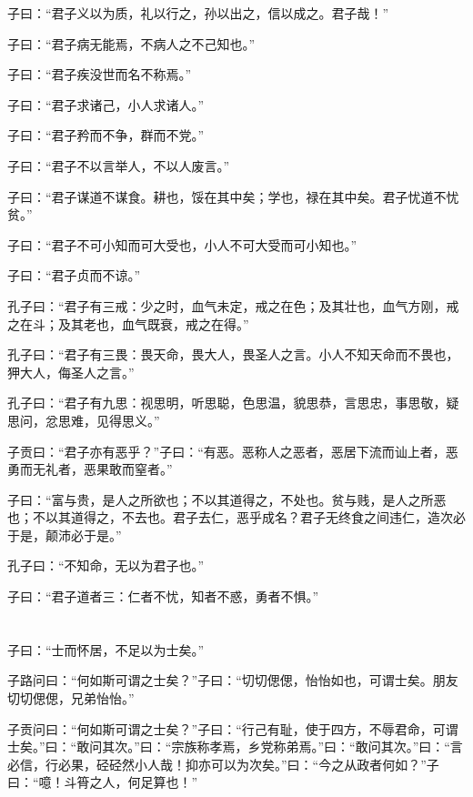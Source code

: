 \documentclass[a5paper]{ctexbook}
\begin{document}
    子曰：“君子义以为质，礼以行之，孙以出之，信以成之。君子哉！”

    子曰：“君子病无能焉，不病人之不己知也。”

    子曰：“君子疾没世而名不称焉。”

    子曰：“君子求诸己，小人求诸人。”

    子曰：“君子矜而不争，群而不党。”

    子曰：“君子不以言举人，不以人废言。”

    子曰：“君子谋道不谋食。耕也，馁在其中矣；学也，禄在其中矣。君子忧道不忧贫。”

    子曰：“君子不可小知而可大受也，小人不可大受而可小知也。”

    子曰：“君子贞而不谅。”

    孔子曰：“君子有三戒：少之时，血气未定，戒之在色；及其壮也，血气方刚，戒之在斗；及其老也，血气既衰，戒之在得。”

    孔子曰：“君子有三畏：畏天命，畏大人，畏圣人之言。小人不知天命而不畏也，狎大人，侮圣人之言。”

    孔子曰：“君子有九思：视思明，听思聪，色思温，貌思恭，言思忠，事思敬，疑思问，忿思难，见得思义。”

    子贡曰：“君子亦有恶乎？”子曰：“有恶。恶称人之恶者，恶居下流而讪上者，恶勇而无礼者，恶果敢而窒者。”

    子曰：“富与贵，是人之所欲也；不以其道得之，不处也。贫与贱，是人之所恶也；不以其道得之，不去也。君子去仁，恶乎成名？君子无终食之间违仁，造次必于是，颠沛必于是。”

    孔子曰：“不知命，无以为君子也。”

    子曰：“君子道者三：仁者不忧，知者不惑，勇者不惧。”

    \chapter{}

    子曰：“士而怀居，不足以为士矣。”

    子路问曰：“何如斯可谓之士矣？”子曰：“切切偲偲，怡怡如也，可谓士矣。朋友切切偲偲，兄弟怡怡。”

    子贡问曰：“何如斯可谓之士矣？”子曰：“行己有耻，使于四方，不辱君命，可谓士矣。”曰：“敢问其次。”曰：“宗族称孝焉，乡党称弟焉。”曰：“敢问其次。”曰：“言必信，行必果，硁硁然小人哉！抑亦可以为次矣。”曰：“今之从政者何如？”子曰：“噫！斗筲之人，何足算也！”

    \chapter{}
\end{document}
